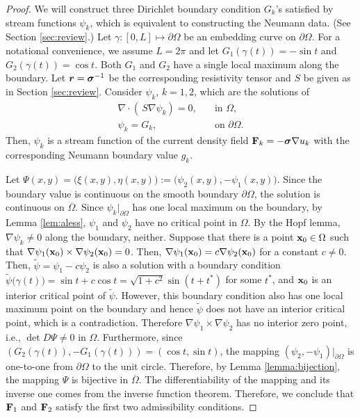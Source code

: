 \documentclass[11pt]{amsart}
\theoremstyle{plain}
\theoremstyle{remark}
\numberwithin{equation}{section}
\numberwithin{Thm}{section}
\def\F{{\bf F}}
\def\r{{\bf r}}
\def\x{{\bf x}}
\def\ds{\displaystyle}
\def\Sigma{\mbox{\boldmath$\sigma$}}
\def\r{\mbox{\boldmath$r$}}
\begin{document}
\begin{proof}  We will construct three Dirichlet boundary condition $G_k$'s satisfied by stream functions $\psi_k$, which is equivalent to constructing the Neumann data. (See Section \ref{sec:review}.) Let $\gamma:[0, L] \mapsto \partial\Omega$ be an embedding curve on $\partial\Omega$. For a notational convenience, we assume $L=2\pi$ and let $G_1(\gamma(t))=-\sin t$ and $G_2(\gamma(t))=\cos t$. Both $G_1$ and $G_2$ have a single local maximum along the boundary. Let $\r=\Sigma^{-1}$ be the corresponding resistivity tensor and $S$ be given as in Section \ref{sec:review}. Consider $\psi_k$, $k=1,2$, which are the solutions of
\begin{equation}\label{Eqn3.3}
\begin{array}{cc}\ds
 \nabla\cdot(\,S\nabla \psi_k)  =0, &\quad \text{in $\Omega$},\\
 \psi_k=G_k, &\quad \text{on $\partial\Omega$}.
\end{array}
\end{equation}
Then, $\psi_k$ is a stream function of the current density field $\F_k = -\Sigma\nabla u_k$ with the corresponding Neumann boundary value $g_k$.  

Let $\Psi(x,y)= \big(\xi(x,y),\eta(x,y)\big):=\big(\psi_2(x,y), -\psi_1(x,y)\big)$. Since the boundary value is continuous on the smooth boundary $\partial\Omega$, the solution is continuous on $\overline\Omega$. Since $\psi_k|_{\partial\Omega}$ has one local maximum on the boundary, by Lemma \ref{lem:aless}, $\psi_1$ and $\psi_2$ have no critical point in $\Omega$. By the Hopf lemma, $\nabla\psi_k \ne 0$ along the boundary, neither. Suppose that there is a point $\x_0 \in \Omega$ such that $\nabla\psi_1(\x_0) \times \nabla\psi_2(\x_0) =0$. Then, $\nabla\psi_1(\x_0) = c \nabla\psi_2(\x_0)$ for a constant $c\ne0$. Then, $\tilde\psi = \psi_1 - c\psi_2$  is also a solution with a boundary condition $\tilde\psi\big(\gamma(t)\big) = \sin t + c\cos t =\sqrt{1+c^2} \sin(t+t^*)$ for some $t^*$, and $\x_0$ is an interior critical point of $\tilde\psi$. However, this boundary condition also has one local maximum point on the boundary and hence $\tilde\psi$ does not have an interior critical point, which is a contradiction. Therefore $\nabla\psi_1 \times \nabla\psi_2$  has no interior zero point, i.e., $\det D\Psi\ne0$ in $\Omega$. Furthermore, since $(G_2(\gamma(t)),-G_1(\gamma(t))) = (\cos t, \sin t)$, the mapping $(\psi_2,-\psi_1)|_{\partial \Omega}$ is one-to-one from $\partial\Omega$ to the unit circle. Therefore, by Lemma \ref{lemma:bijection}, the mapping $\Psi$ is bijective in $\overline\Omega$. The differentiability of the mapping and its inverse one comes from the inverse function theorem. Therefore, we conclude that $\F_1$ and $\F_2$ satisfy the first two admissibility conditions.


\end{proof}
\end{document}
